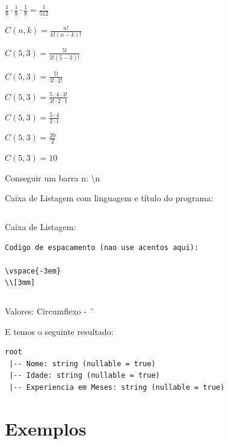 \documentclass[a4paper,11pt]{article}
\begin{document}
\maketitle %
\thispagestyle{fancy} %

$\frac{1}{8} \cdot \frac{1}{8} \cdot \frac{1}{8} = \frac{1}{512}$

$C(n, k) = \frac{n!}{k!(n - k)!}$

$C(5, 3) = \frac{5!}{3!(5 - 3)!}$

$C(5, 3) = \frac{5!}{3! \cdot 2!}$ 

$C(5, 3) = \frac{5 \cdot 4 \cdot 3!}{3! \cdot 2 \cdot 1}$

$C(5, 3) = \frac{5 \cdot 4}{2 \cdot 1}$

$C(5, 3) = \frac{20}{2}$

$C(5, 3) = 10$

Conseguir um barra n: $\setminus$n

Caixa de Listagem com linguagem e título do programa:
\begin{lstlisting}[language=Java, title={CocktailController.java}]
\end{lstlisting}

Caixa de Listagem:
\begin{lstlisting}[]
Codigo de espacamento (nao use acentos aqui):

\vspace{-3em}
\\[3mm]
\end{lstlisting}

\begin{lstlisting}[]
\end{lstlisting}

\begin{abstract}
	\textbf{odelo de documento. \lipsum[4-1]}
\end{abstract}

Valores:
Circumflexo - $\string^$

E temos o seguinte resultado: \vspace{-1em}
\begin{verbatim}
root
 |-- Nome: string (nullable = true)
 |-- Idade: string (nullable = true)
 |-- Experiencia em Meses: string (nullable = true)
\end{verbatim}


\section{Exemplos}
\end{document}
